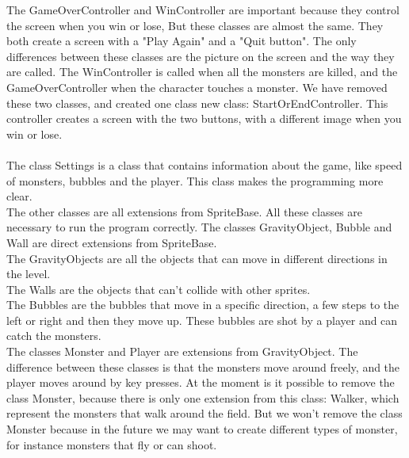 \noindent The GameOverController and WinController are important because they control the screen when you win or lose, But these classes are almost the same. They both create a screen with a "Play Again" and a "Quit button". The only differences between these classes are the picture on the screen and the way they are called. The WinController is called when all the monsters are killed, and the GameOverController when the character touches a monster. We have removed these two classes, and created one class new class: StartOrEndController. This controller creates a screen with the two buttons, with a different image when you win or lose.\\
\\
The class Settings is a class that contains information about the game, like speed of monsters, bubbles and the player. This class makes the programming more clear.
\\
The other classes are all extensions from SpriteBase. All these classes are necessary to run the program correctly. The classes GravityObject, Bubble and Wall are direct extensions from SpriteBase.\\
The GravityObjects are all the objects that can move in different directions in the level.\\
The Walls are the objects that can't collide with other sprites.\\
The Bubbles are the bubbles that move in a specific direction, a few steps to the left or right and then they move up. These bubbles are shot by a player and can catch the monsters.\\
The classes Monster and Player are extensions from GravityObject. The difference between these classes is that the monsters move around freely, and the player moves around by key presses. At the moment is it possible to remove the class Monster, because there is only one extension from this class: Walker, which represent the monsters that walk around the field. But we won't remove the class Monster because in the future we may want to create different types of monster, for instance monsters that fly or can shoot.